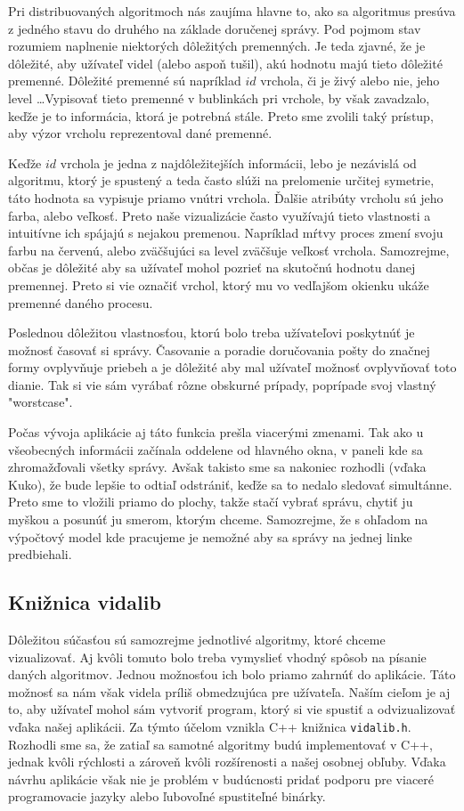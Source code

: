 Pri distribuovaných algoritmoch nás zaujíma hlavne to, ako sa algoritmus presúva z jedného stavu do
druhého na základe doručenej správy. Pod pojmom stav rozumiem naplnenie niektorých dôležitých
premenných. Je teda zjavné, že je dôležité, aby užívateľ videl (alebo aspoň tušil), akú hodnotu majú
tieto dôležité premenné. Dôležité premenné sú napríklad $id$ vrchola, či je živý alebo nie, jeho
level \dots Vypisovať tieto premenné v bublinkách pri vrchole, by však zavadzalo, keďže je to
informácia, ktorá je potrebná stále. Preto sme zvolili taký prístup, aby výzor vrcholu reprezentoval
dané premenné.

Keďže $id$ vrchola je jedna z najdôležitejších informácii, lebo je nezávislá od algoritmu, ktorý je
spustený a teda často slúži na prelomenie určitej symetrie, táto hodnota sa vypisuje priamo vnútri
vrchola. Ďalšie atribúty vrcholu sú jeho farba, alebo veľkosť. Preto naše vizualizácie často
využívajú tieto vlastnosti a intuitívne ich spájajú s nejakou premenou. Napríklad mŕtvy proces zmení
svoju farbu na červenú, alebo zväčšujúci sa level zväčšuje veľkosť vrchola.
Samozrejme, občas je dôležité aby sa užívateľ mohol pozrieť na skutočnú hodnotu danej premennej.
Preto si vie označiť vrchol, ktorý mu vo vedľajšom okienku ukáže premenné daného procesu.

Poslednou dôležitou vlastnosťou, ktorú bolo treba užívateľovi poskytnúť je možnosť časovať si
správy. Časovanie a poradie doručovania pošty do značnej formy ovplyvňuje priebeh a je dôležité aby
mal užívateľ možnosť ovplyvňovať toto dianie. Tak si vie sám vyrábať rôzne obskurné prípady,
poprípade svoj vlastný "worstcase".

Počas vývoja aplikácie aj táto funkcia prešla viacerými zmenami. Tak ako u všeobecných informácii
začínala oddelene od hlavného okna, v paneli kde sa zhromažďovali všetky správy. Avšak takisto sme sa
nakoniec rozhodli (vďaka Kuko), že bude lepšie to odtiaľ odstrániť, keďže sa to nedalo sledovať
simultánne. Preto sme to vložili priamo do plochy, takže stačí vybrať správu, chytiť ju myškou a
posunúť ju smerom, ktorým chceme. Samozrejme, že s ohľadom na výpočtový model kde pracujeme je
nemožné aby sa správy na jednej linke predbiehali.

\subsection{Knižnica vidalib}

Dôležitou súčasťou sú samozrejme jednotlivé algoritmy, ktoré chceme vizualizovať. Aj kvôli tomuto bolo
treba vymyslieť vhodný spôsob na písanie daných algoritmov. Jednou možnosťou ich bolo priamo zahrnúť
do aplikácie. Táto možnosť sa nám však videla príliš obmedzujúca pre užívateľa. Naším cieľom je aj
to, aby užívateľ mohol sám vytvoriť program, ktorý si vie spustiť a odvizualizovať vďaka našej
aplikácii. Za týmto účelom vznikla C++ knižnica \verb!vidalib.h!. Rozhodli sme sa, že zatiaľ sa samotné
algoritmy budú implementovať v C++, jednak kvôli rýchlosti a zároveň kvôli rozšírenosti a našej
osobnej obľuby. Vďaka návrhu aplikácie však nie je problém v budúcnosti pridať podporu pre viaceré
programovacie jazyky alebo ľubovoľné spustiteľné binárky.

